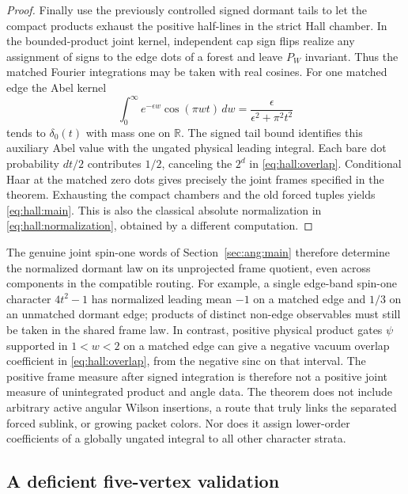 \begin{proof}
Finally use the previously controlled signed dormant tails to
let the compact products exhaust the positive half-lines in the
strict Hall chamber. In the bounded-product joint kernel,
independent cap sign flips realize any assignment of signs to
the edge dots of a forest and leave \(P_W\) invariant. Thus the
matched Fourier integrations may be taken with real cosines.
For one matched edge the Abel kernel
\[
       \int_0^\infty e^{-\epsilon w}\cos(\pi wt)\,dw
          =\frac{\epsilon}{\epsilon^2+\pi^2t^2}
\]
tends to \(\delta_0(t)\) with mass one on \(\mathbb R\). The signed
tail bound identifies this auxiliary Abel value with the
ungated physical leading integral. Each bare dot probability
\(dt/2\) contributes \(1/2\), canceling the \(2^d\) in
\eqref{eq:hall:overlap}. Conditional Haar at the matched zero
dots gives precisely the joint frames specified in the theorem.
Exhausting the compact chambers and the old forced tuples yields
\eqref{eq:hall:main}. This is also the classical absolute
normalization in \eqref{eq:hall:normalization}, obtained by a
different computation.
\end{proof}

The genuine joint spin-one words of Section~\ref{sec:ang:main}
therefore determine the normalized dormant law on its
unprojected frame quotient, even across components in the
compatible routing. For example, a single edge-band spin-one
character \(4t^2-1\) has normalized leading mean \(-1\) on a
matched edge and \(1/3\) on an unmatched dormant edge; products
of distinct non-edge observables must still be taken in the shared
frame law. In contrast, positive physical product gates
\(\psi\) supported in \(1<w<2\) on a matched edge can give a
negative vacuum overlap coefficient in
\eqref{eq:hall:overlap}, from the negative sinc on that interval.
The positive frame measure after signed integration is therefore
not a positive joint measure of unintegrated product and angle
data. The theorem does not include arbitrary active angular
Wilson insertions, a route that truly links the separated forced
sublink, or growing packet colors. Nor does it assign lower-order
coefficients of a globally ungated integral to all other
character strata.

\subsection{A deficient five-vertex validation}
\label{sec:hall:broom}

